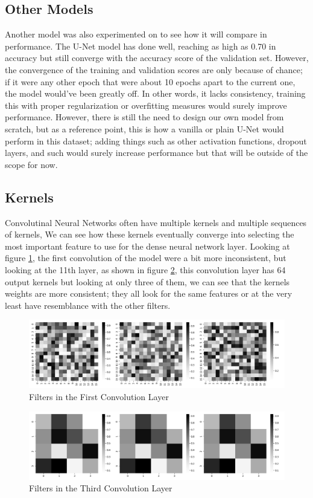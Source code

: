 \subsection{Other Models}

Another model was also experimented on to see how it will compare in performance. The U-Net model has done well, reaching as high as 0.70 in accuracy but still converge with the accuracy score of the validation set. However, the convergence of the training and validation scores are only because of chance; if it were any other epoch that were about 10 epochs apart to the current one, the model would've been greatly off. In other words, it lacks consistency, training this with proper regularization or overfitting measures would surely improve performance. However, there is still the need to design our own model from scratch, but as a reference point, this is how a vanilla or plain U-Net would perform in this dataset; adding things such as other activation functions, dropout layers, and such would surely increase performance but that will be outside of the scope for now. 

\subsection{Kernels}

Convolutinal Neural Networks often have multiple kernels and multiple sequences of kernels, We can see how these kernels eventually converge into selecting the most important feature to use for the dense neural network layer. Looking at figure \ref{fig:kernels}, the first convolution of the model were a bit more inconsistent, but looking at the 11th layer, as shown in figure \ref{fig:lower_dimension_kernels}, this convolution layer has 64 output kernels but looking at only three of them, we can see that the kernels weights are more consistent; they all look for the same features or at the very least have resemblance with the other filters.

\begin{figure}[H]
  \centering
  \includegraphics[width=\linewidth]{figures/kernels.png}
  \caption{Filters in the First Convolution Layer}
  \label{fig:kernels}
\end{figure}

\begin{figure}[H]
  \centering
  \includegraphics[width=\linewidth]{figures/kernels_lower.png}
  \caption{Filters in the Third Convolution Layer}
  \label{fig:lower_dimension_kernels}
\end{figure}
